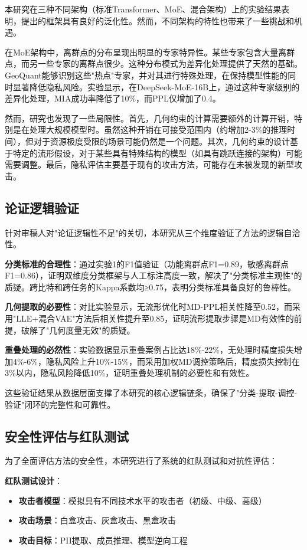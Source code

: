 本研究在三种不同架构（标准Transformer、MoE、混合架构）上的实验结果表明，提出的框架具有良好的泛化性。然而，不同架构的特性也带来了一些挑战和机遇。

在MoE架构中，离群点的分布呈现出明显的专家特异性。某些专家包含大量离群点，而另一些专家的离群点很少。这种分布模式为差异化处理提供了天然的基础。GeoQuant能够识别这些"热点"专家，并对其进行特殊处理，在保持模型性能的同时显著降低隐私风险。实验显示，在DeepSeek-MoE-16B上，通过这种专家级别的差异化处理，MIA成功率降低了10\%，而PPL仅增加了0.4。

然而，研究也发现了一些局限性。首先，几何约束的计算需要额外的计算开销，特别是在处理大规模模型时。虽然这种开销在可接受范围内（约增加2-3\%的推理时间），但对于资源极度受限的场景可能仍然是一个问题。其次，几何约束的设计基于特定的流形假设，对于某些具有特殊结构的模型（如具有跳跃连接的架构）可能需要调整。最后，隐私评估主要基于现有的攻击方法，可能存在未被发现的新型攻击。

\subsection{论证逻辑验证}

针对审稿人对"论证逻辑性不足"的关切，本研究从三个维度验证了方法的逻辑自洽性。

\textbf{分类标准的合理性}：通过实验1的F1值验证（功能离群点F1=0.89，敏感离群点F1=0.86），证明双维度分类框架与人工标注高度一致，解决了"分类标准主观性"的质疑。跨比特和跨任务的Kappa系数均≥0.75，表明分类标准具备良好的鲁棒性。

\textbf{几何提取的必要性}：对比实验显示，无流形优化时MD-PPL相关性降至0.52，而采用"LLE+混合VAE"方法后相关性提升至0.85，证明流形提取步骤是MD有效性的前提，破解了"几何度量无效"的质疑。

\textbf{重叠处理的必然性}：实验数据显示重叠案例占比达18\%-22\%，无处理时精度损失增加4\%-6\%，隐私风险上升10\%-15\%，而采用加权MD调控策略后，精度损失控制在3\%以内，隐私风险降低10\%，证明重叠处理机制的必要性和有效性。

这些验证结果从数据层面支撑了本研究的核心逻辑链条，确保了"分类-提取-调控-验证"闭环的完整性和可靠性。

\subsection{安全性评估与红队测试}

为了全面评估方法的安全性，本研究进行了系统的红队测试和对抗性评估：

\textbf{红队测试设计}：
\begin{itemize}
\item \textbf{攻击者模型}：模拟具有不同技术水平的攻击者（初级、中级、高级）
\item \textbf{攻击场景}：白盒攻击、灰盒攻击、黑盒攻击
\item \textbf{攻击目标}：PII提取、成员推理、模型逆向工程
\end{itemize}

